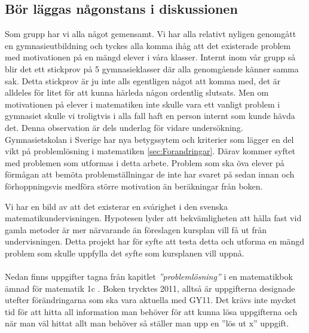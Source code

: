 \subsection{Bör läggas någonstans i diskussionen}

\textcolor{WildStrawberry}{
    Som grupp har vi alla något gemensamt. Vi har alla relativt nyligen genomgått en gymnasieutbildning och tyckes alla komma ihåg att det existerade problem med motivationen på en mängd elever i våra klasser. Internt inom vår grupp så blir det ett stickprov på 5 gymnasieklasser där alla genomgående känner samma sak. Detta stickprov är ju inte alls egentligen något att komma med, det är alldeles för litet för att kunna härleda någon ordentlig slutsats. Men om motivationen på elever i matematiken inte skulle vara ett vanligt problem i gymnasiet skulle vi troligtvis i alla fall haft en person internt som kunde hävda det. Denna observation är dels underlag för vidare undersökning. Gymnasietskolan i Sverige har nya betygssytem och kriterier som lägger en del vikt på problemlösning i matematiken \ref{sec:Forandringar}. Därav kommer syftet med problemen som utformas i detta arbete. Problem som ska öva elever på förmågan att bemöta problemställningar de inte har svaret på sedan innan och förhoppningsvis medföra större motivation än beräkningar från boken.
}

\textcolor{WildStrawberry}{
    Vi har en bild av att det existerar en svårighet i den svenska matematikundervisningen. Hypotesen lyder att bekvämligheten att hålla fast vid gamla metoder är mer närvarande än föreslagen kursplan vill få ut från undervisningen. Detta projekt har för syfte att testa detta och utforma en mängd problem som skulle uppfylla det syfte som kursplanen vill uppnå. }
\\ \\
    \textcolor{WildStrawberry}{
    Nedan finns uppgifter tagna från  kapitlet \textit{''problemlösning''} i en matematikbok ämnad för matematik 1c \cite{matte5000}. Boken trycktes 2011, alltså är uppgifterna designade utefter förändringarna som ska vara aktuella med GY11. Det krävs inte mycket tid för att hitta all information man behöver för att kunna lösa uppgifterna och när man väl hittat allt man behöver så ställer man upp en ''lös ut x'' uppgift.}


